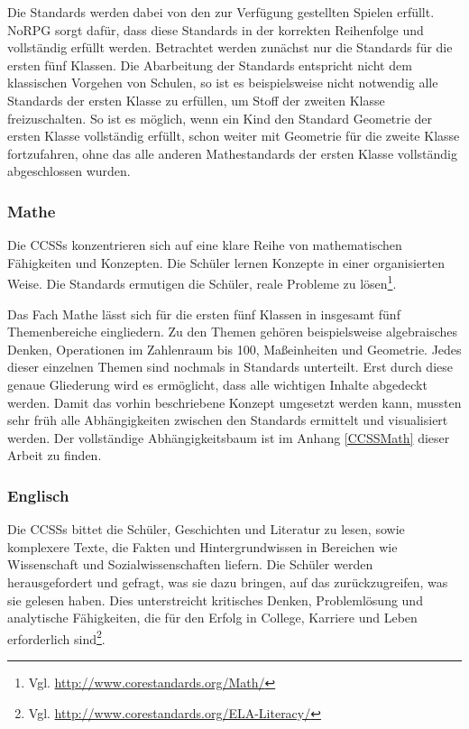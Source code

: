 Die Standards werden dabei von den zur Verfügung gestellten Spielen erfüllt. NoRPG sorgt dafür, dass diese Standards in der korrekten Reihenfolge und vollständig erfüllt werden. Betrachtet werden zunächst nur die Standards für die ersten fünf Klassen. Die Abarbeitung der Standards entspricht nicht dem klassischen Vorgehen von Schulen, so ist es beispielsweise nicht notwendig alle Standards der ersten Klasse zu erfüllen, um Stoff der zweiten Klasse freizuschalten. So ist es möglich, wenn ein Kind den Standard Geometrie der ersten Klasse vollständig erfüllt, schon weiter mit Geometrie für die zweite Klasse fortzufahren, ohne das alle anderen Mathestandards der ersten Klasse vollständig abgeschlossen wurden.

\subsubsection{Mathe}
Die \acp{CCSS} konzentrieren sich auf eine klare Reihe von mathematischen Fähigkeiten und Konzepten. Die Schüler lernen Konzepte in einer organisierten Weise. Die Standards ermutigen die Schüler, reale Probleme zu lösen\footnote{Vgl. \url{http://www.corestandards.org/Math/}}.

Das Fach Mathe lässt sich für die ersten fünf Klassen in insgesamt fünf Themenbereiche eingliedern. Zu den Themen gehören beispielsweise algebraisches Denken, Operationen im Zahlenraum bis 100, Maßeinheiten und Geometrie. Jedes dieser einzelnen Themen sind nochmals in Standards unterteilt. Erst durch diese genaue Gliederung wird es ermöglicht, dass alle wichtigen Inhalte abgedeckt werden. Damit das vorhin beschriebene Konzept umgesetzt werden kann, mussten sehr früh alle Abhängigkeiten zwischen den Standards ermittelt und visualisiert werden. Der vollständige Abhängigkeitsbaum ist im Anhang \ref{CCSSMath} dieser Arbeit zu finden.

\subsubsection{Englisch}
Die \acp{CCSS} bittet die Schüler, Geschichten und Literatur zu lesen, sowie komplexere Texte, die Fakten und Hintergrundwissen in Bereichen wie Wissenschaft und Sozialwissenschaften liefern. Die Schüler werden herausgefordert und gefragt, was sie dazu bringen, auf das zurückzugreifen, was sie gelesen haben. Dies unterstreicht kritisches Denken, Problemlösung und analytische Fähigkeiten, die für den Erfolg in College, Karriere und Leben erforderlich sind\footnote{Vgl. \url{http://www.corestandards.org/ELA-Literacy/}}.

